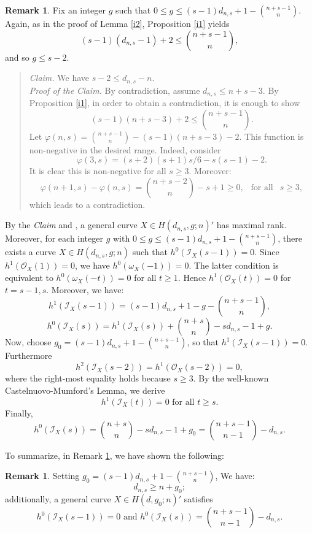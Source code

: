 \documentclass[a4, 11pt]{amsart}
\theoremstyle{plain}
\theoremstyle{definition}
\newtheorem{remark}[theorem]{Remark}
\newcommand{\enm}[1]{\ensuremath{#1}}          %
\newcommand{\cal}[1]{\mathcal{#1}}
\newcommand{\Ii}{\enm{\cal{I}}}
\newcommand{\Oo}{\enm{\cal{O}}}
\renewcommand{\phi}{\varphi}
\begin{document}
\begin{remark}\label{i3}
Fix an integer $g$ such that $0\le g \le  (s-1)d_{n,s}+1-\binom{n+s-1}{n}$. Again, as in the proof of Lemma \ref{i2}, Proposition \ref{i1} yields
\[
(s-1)(d_{n,s} -1)+2 \le \binom{n+s-1}{n},
\] 
and so $g\le s-2$. 
\vspace{3mm}

\begin{quote}
{\it Claim.} We have $s-2 \le d_{n,s}-n$.\\
{\it Proof of the Claim.} By contradiction, assume $d_{n,s} \le n+s-3$. By Proposition \ref{i1}, in order to obtain a contradiction, it is enough to show 
\[
(s-1)(n+s-3) +2 \le \binom{n+s-1}{n}.
\] 
Let $\phi (n,s) = \binom{n+s-1}{n} - (s-1)(n+s-3)-2$. This function is non-negative in the desired range. Indeed, consider
\[
\phi (3,s) = (s+2)(s+1)s/6 -s(s-1)-2.
\]
It is clear this is non-negative for all $s\ge 3$. Moreover: 
\[
\phi (n+1,s) -\phi (n,s) =\binom{n+s-2}{n} -s+1 \ge 0, \ \ \mbox{ for all } \ \  s\ge 3, 
\]
which leads to a contradiction. 
\end{quote}

By the {\it Claim} and \cite{be2, be3}, a general curve $X\in H(d_{n,s},g;n)'$ has maximal rank. Moreover, for each integer $g$ with $0\le
g\le  (s-1)d_{n,s}+1-\binom{n+s-1}{n}$, there exists a curve $X\in H(d_{n,s},g;n)$ such that $h^0(\Ii _X(s-1))=0$. Since $h^1(\Oo _X(1)) =0$, we
have $h^0(\omega_X(-1)) = 0$. The latter condition is equivalent to $h^0(\omega_X(-t))=0$ for all $t\geq 1$. 
Hence $h^1(\Oo _X(t)) =0$ for $t=s-1,s$. Moreover, we have: 
\[
h^1(\Ii _X(s-1)) = (s-1)d_{n,s}+1-g -\binom{n+s-1}{n},
\]
\[
h^0(\Ii _X(s)) = h^1(\Ii _X(s)) +\binom{n+s}{n} -sd_{n,s}-1+g.
\] 
Now, choose $g_0 = (s-1)d_{n,s} + 1 -\binom{n+s-1}{n}$, so that $h^1(\Ii _X(s-1)) =0$. 
Furthermore 
\[
h^2(\Ii _X(s-2)) =h^1(\Oo _X(s-2)) =0,
\] 
where the right-most equality holds because $s\ge3$. By the well-known Castelnuovo-Mumford's Lemma, we derive 
\[h^1(\Ii _X(t)) =0 \mbox{ for all } t\ge s. \] 
Finally,
\[
h^0(\Ii _X(s)) =\binom{n+s}{n} -sd_{n,s}-1+g_0 = \binom{n+s-1}{n-1}-d_{n,s}.
\]
\end{remark}

To summarize, in Remark \ref{i3}, we have shown the following: 

\begin{remark}\label{observation}
Setting $g_0 = (s-1)d_{n,s} + 1 -\binom{n+s-1}{n}$, We have: 
\[
d_{n,s} \ge n+g_0;
\]
additionally, a general curve $X\in H(d,g_0;n)'$ satisfies 
\[
h^0(\Ii _X(s-1)) =0 \mbox{ and } h^0(\Ii _X(s))=\binom{n+s-1}{n-1} -d_{n,s}.
\]
\end{remark}
\end{document}

